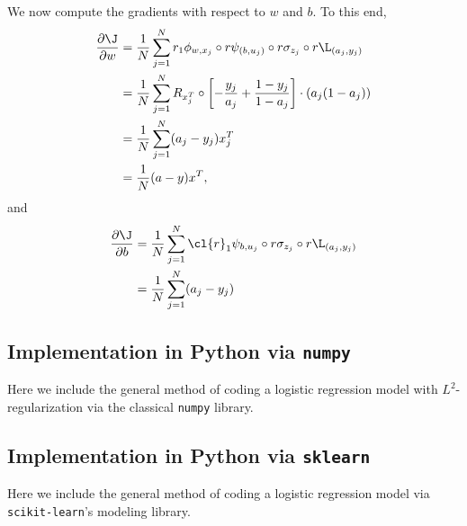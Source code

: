 We now compute the gradients with respect to $w$ and $b$.  To this end,
\begin{align*}
	\frac{\partial\J}{\partial w}&=\frac{1}{N}\sum_{j=1}^Nr_1\phi_{w,x_j}\circ r\psi_{(b,u_j)}\circ r\sigma_{z_j}\circ r\L_{(a_j,y_j)}\\
	&=\frac{1}{N}\sum_{j=1}^NR_{x_j^T}\circ\left[-\frac{y_j}{a_j}+\frac{1-y_j}{1-a_j}\right]\cdot(a_j(1-a_j))\\
	&=\frac{1}{N}\sum_{j=1}^N(a_j-y_j)x_j^T\\
	&=\frac{1}{N}(a-y)x^T,
\end{align*}
and
\begin{align*}
	\frac{\partial\J}{\partial b}&=\frac{1}{N}\sum_{j=1}^N\cl{r}_1\psi_{b,u_j}\circ r\sigma_{z_j}\circ r\L_{(a_j,y_j)}\\
	&=\frac{1}{N}\sum_{j=1}^N(a_j-y_j)
\end{align*}













\subsection{Implementation in Python via \texttt{numpy}}
Here we include the general method of coding a logistic regression model with $L^2$-regularization via the classical \texttt{numpy} library.




\subsection{Implementation in Python via \texttt{sklearn}}
Here we include the general method of coding a logistic regression model via \texttt{scikit-learn}'s modeling library.


